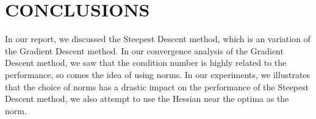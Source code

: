 \documentclass{acm_proc_article-sp}
\begin{document}
\section{CONCLUSIONS}
In our report, we discussed the Steepest Descent method, which is an variation of the Gradient Descent method. In our convergence analysis of the Gradient Descent method, we saw that the condition number is highly related to the performance, so comes the idea of using norms. In our experiments, we illustrates that the choice of norms has a drastic impact on the performance of the Steepest Descent method, we also attempt to use the Hessian near the optima as the norm.


 

\balancecolumns
\end{document}
